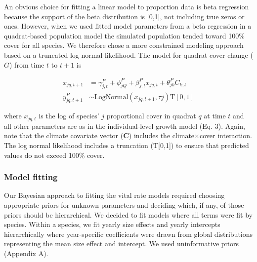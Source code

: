 \documentclass[12pt,]{article}
\begin{document}
An obvious choice for fitting a linear model to proportion data is beta
regression because the support of the beta distribution is {[}0,1{]},
not including true zeros or ones. However, when we used fitted model
parameters from a beta regression in a quadrat-based population model
the simulated population tended toward 100\% cover for all species. We
therefore chose a more constrained modeling approach based on a
truncated log-normal likelihood. The model for quadrat cover change
($G$) from time $t$ to $t+1$ is

\begin{align}
x_{jq,t+1} &= \gamma^{P}_{j,t} + \phi^{P}_{jQ} + \beta^{P}_{j,t}x_{jq,t} + \theta^{P}_{jk}C_{k,t} \\
y^{P}_{jq,t+1} &\sim \text{LogNormal}(x_{jq,t+1}, \tau{j}) \text{T}[0,1]
\end{align}

where $x_{jq,t}$ is the log of species' $j$ proportional cover in
quadrat $q$ at time $t$ and all other parameters are as in the
individual-level growth model (Eq. 3). Again, note that the climate
covariate vector (\textbf{C}) includes the climate$\times$cover
interaction. The log normal likelihood includes a truncation
(T{[}0,1{]}) to ensure that predicted values do not exceed 100\% cover.

\subsubsection{Model fitting}\label{model-fitting}

Our Bayesian approach to fitting the vital rate models required choosing
appropriate priors for unknown parameters and deciding which, if any, of
those priors should be hierarchical. We decided to fit models where all
terms were fit by species. Within a species, we fit yearly size effects
and yearly intercepts hierarchically where year-specific coefficients
were drawn from global distributions representing the mean size effect
and intercept. We used uninformative priors (Appendix A).
\end{document}

